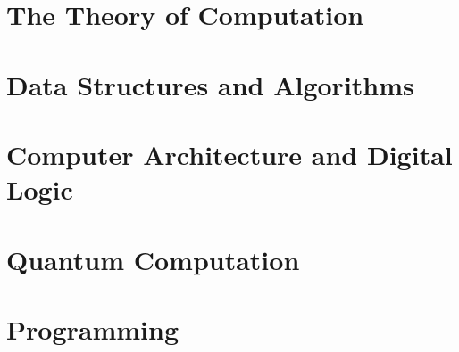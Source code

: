 \documentclass[11pt,twoside=semi,openright,numbers=noenddot,titlepage=false]{scrbook}
\begin{document}
\part{The Theory of Computation}\label{part:theoretical}
\parttoc{}
% 
% 
% 
% 
% 
% 
% 
% 
% 
% 
% 
% 
% 
% 
% 


\part{Data Structures and Algorithms}\label{part:dsa}
\parttoc{}
% 
% 
% 
% 
% 
% 
% 
% 


\part{Computer Architecture and Digital Logic}\label{part:architecture}
\parttoc{}
% 
% 
% 
% 
% 


\part{Quantum Computation}\label{part:quantum}
\parttoc{}
% 
% 
% 
% 
% 


\part{Programming}\label{part:programming}
\parttoc{}
% 
% 
% 
% 
% 
% 
\end{document}
